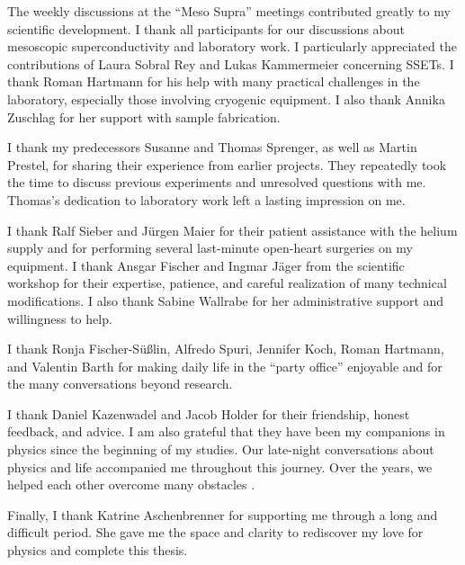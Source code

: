     The weekly discussions at the ``Meso Supra'' meetings contributed greatly to my scientific development. I thank all participants for our discussions about mesoscopic superconductivity and laboratory work. I particularly appreciated the contributions of Laura Sobral Rey and Lukas Kammermeier concerning SSETs. I thank Roman Hartmann for his help with many practical challenges in the laboratory, especially those involving cryogenic equipment. I also thank Annika Zuschlag for her support with sample fabrication.

    I thank my predecessors Susanne and Thomas Sprenger, as well as Martin Prestel, for sharing their experience from earlier projects. They repeatedly took the time to discuss previous experiments and unresolved questions with me. Thomas's dedication to laboratory work left a lasting impression on me.

    I thank Ralf Sieber and Jürgen Maier for their patient assistance with the helium supply and for performing several last-minute open-heart surgeries on my equipment.
    I thank Ansgar Fischer and Ingmar Jäger from the scientific workshop for their expertise, patience, and careful realization of many technical modifications. I also thank Sabine Wallrabe for her administrative support and willingness to help.

    I thank Ronja Fischer-Sü\ss lin, Alfredo Spuri, Jennifer Koch, Roman Hartmann, and Valentin Barth for making daily life in the ``party office'' enjoyable and for the many conversations beyond research.

    I thank Daniel Kazenwadel and Jacob Holder for their friendship, honest feedback, and advice. I am also grateful that they have been my companions in physics since the beginning of my studies. Our late-night conversations about physics and life accompanied me throughout this journey. Over the years, we helped each other overcome many obstacles \cite{upper_unsuccessful_1974}.

    Finally, I thank Katrine Aschenbrenner for supporting me through a long and difficult period. She gave me the space and clarity to rediscover my love for physics and complete this thesis.
